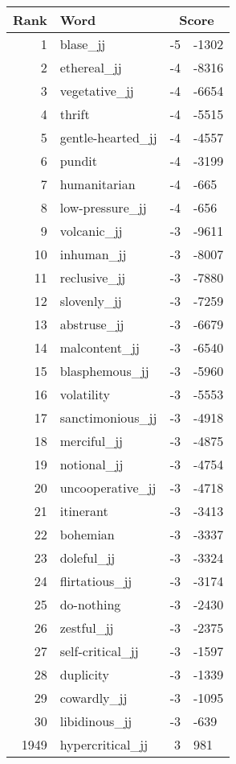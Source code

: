 \begin{longtable}[!htbp]{| rlr@{.}l |}
    \hline
    \textbf{Rank} & \textbf{Word} & \multicolumn{2}{c|}{\textbf{Score}} \\
    \hline
    \endhead
    1 & blase\_jj & -5 & -1302 \\
    2 & ethereal\_jj & -4 & -8316 \\
    3 & vegetative\_jj & -4 & -6654 \\
    4 & thrift & -4 & -5515 \\
    5 & gentle-hearted\_jj & -4 & -4557 \\
    6 & pundit & -4 & -3199 \\
    7 & humanitarian & -4 & -665 \\
    8 & low-pressure\_jj & -4 & -656 \\
    9 & volcanic\_jj & -3 & -9611 \\
    10 & inhuman\_jj & -3 & -8007 \\
    11 & reclusive\_jj & -3 & -7880 \\
    12 & slovenly\_jj & -3 & -7259 \\
    13 & abstruse\_jj & -3 & -6679 \\
    14 & malcontent\_jj & -3 & -6540 \\
    15 & blasphemous\_jj & -3 & -5960 \\
    16 & volatility & -3 & -5553 \\
    17 & sanctimonious\_jj & -3 & -4918 \\
    18 & merciful\_jj & -3 & -4875 \\
    19 & notional\_jj & -3 & -4754 \\
    20 & uncooperative\_jj & -3 & -4718 \\
    21 & itinerant & -3 & -3413 \\
    22 & bohemian & -3 & -3337 \\
    23 & doleful\_jj & -3 & -3324 \\
    24 & flirtatious\_jj & -3 & -3174 \\
    25 & do-nothing & -3 & -2430 \\
    26 & zestful\_jj & -3 & -2375 \\
    27 & self-critical\_jj & -3 & -1597 \\
    28 & duplicity & -3 & -1339 \\
    29 & cowardly\_jj & -3 & -1095 \\
    30 & libidinous\_jj & -3 & -639 \\
    1949 & hypercritical\_jj & 3 & 981 \\

\end{longtable}
